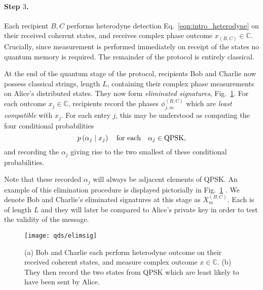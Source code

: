\paragraph{Step $3$.}
Each recipient $B, C$ performs heterodyne detection Eq.~\ref{eqn:intro_heterodyne} on their received coherent states, and receives complex phase outcome $x_{\left(B, C\right)} \in \mathbb{C}$. Crucially, since measurement is performed immediately on receipt of the states no quantum memory is required. The remainder of the protocol is entirely classical.

\iffalse
%
%
each received $\rho\left[\phi_{j, m}^{\left(B, C\right)}\right]$ and receives complex phase outcome $x_{B,C}\in\mathbb{C}$. In other words, they perform the POVM
\begin{equation}
E\left[x\right] := \otimes_{j=1}^L E_j\left[x\right] \qq{with} E_j\left[x\right] := \frac{1}{\sqrt{\pi}} \ket{x}_j\bra{x}_j
\end{equation}
with $x \in \mathbb{C}$. 
\fi


At the end of the quantum stage of the protocol, recipients Bob and Charlie now possess classical strings, length $L$, containing their complex phase measurements on Alice's distributed states. They now form \emph{eliminated signatures}, Fig.~\ref{fig:elimsig}. For each outcome $x_j\in\mathbb{C}$, recipients record the phases $\phi_{j, m}^{\left(B, C\right)}$ which are \emph{least compatible} with $x_j$. For each entry $j$, this may be understood as computing the four conditional probabilities 
\begin{equation}
p\left(\alpha_j \given x_j\right) \qq{for each} \alpha_j \in \text{QPSK},
\end{equation}
and recording the $\alpha_j$ giving rise to the two smallest of these conditional probabilities.

Note that these recorded $\alpha_j$ will always be adjacent elements of QPSK. An example of this elimination procedure is displayed pictorially in Fig.~\ref{fig:elimsig}
. We denote Bob and Charlie's eliminated signatures at this stage as $X_m^{\left(B, C\right)}$. Each is of length $L$ and they will later be compared to Alice's private key in order to test the validity of the message.

\begin{figure}[htp]
\centering
\texttt{[image: qds/elimsig]}
\caption{\label{fig:elimsig} (a) Bob and Charlie each perform heterodyne outcome on their received coherent states, and measure complex outcome $x \in \mathbb{C}$. (b) They then record the two states from QPSK which are least likely to have been sent by Alice.}
\end{figure}

